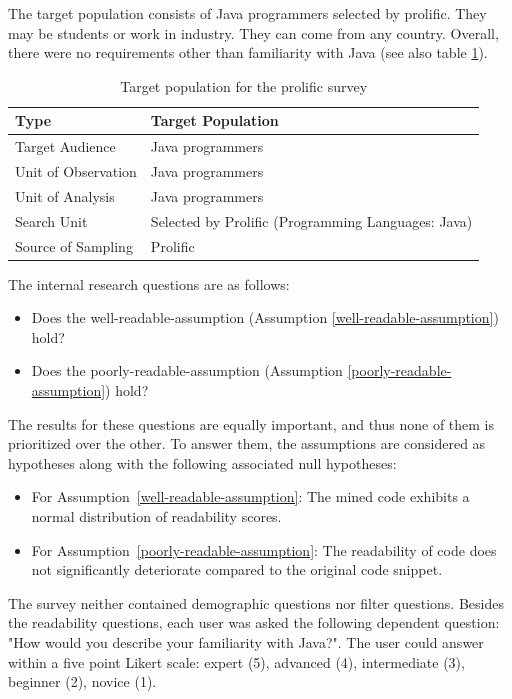 \documentclass[%
class=scrreprt,
chapterprefix=false,%
open=right,%
twoside=false,%
paper=a4,%
logofile={Logo\_zentral\_farbig\_EN.png},%
thesistype=master,%
UKenglish,%
]{se2thesis}
\theoremstyle{definition}
\begin{document}
	The target population consists of Java programmers selected by prolific. They may be students or work in industry. They can come from any country. Overall, there were no requirements other than familiarity with Java (see also table \ref{tab:prolific-audience}).
	
	\begin{table}
		\centering
		\caption{Target population for the prolific survey}
		\vspace{8pt}
		\label{tab:prolific-audience}
		\begin{tabular}{ll}
			\toprule
			\textbf{Type} & \textbf{Target Population} \\
			\midrule
			Target Audience      & Java programmers \\
			Unit of Observation  & Java programmers \\
			Unit of Analysis     & Java programmers \\
			Search Unit          & Selected by Prolific (Programming Languages: Java)\\
			Source of Sampling   & Prolific \\
			\bottomrule
		\end{tabular}
	\end{table}
	
	The internal research questions are as follows:
	\begin{itemize}
		\item Does the well-readable-assumption (Assumption \ref{well-readable-assumption}) hold?
		\item Does the poorly-readable-assumption (Assumption \ref{poorly-readable-assumption}) hold?
	\end{itemize}
	
	The results for these questions are equally important, and thus none of them is prioritized over the other.
	To answer them, the assumptions	are considered as hypotheses along with the following associated null hypotheses:
	\begin{itemize}
		\item For Assumption~\ref{well-readable-assumption}: The mined code exhibits a normal distribution of readability scores.
		\item For Assumption~\ref{poorly-readable-assumption}: The readability of code does not significantly deteriorate compared to the original code snippet.
	\end{itemize}
	
	The survey neither contained demographic questions nor filter questions. Besides the readability questions, each user was asked the following dependent question: "How would you describe your familiarity with Java?". The user could answer within a five point Likert scale: expert (5), advanced (4), intermediate (3), beginner (2), novice (1).
	
\end{document}
